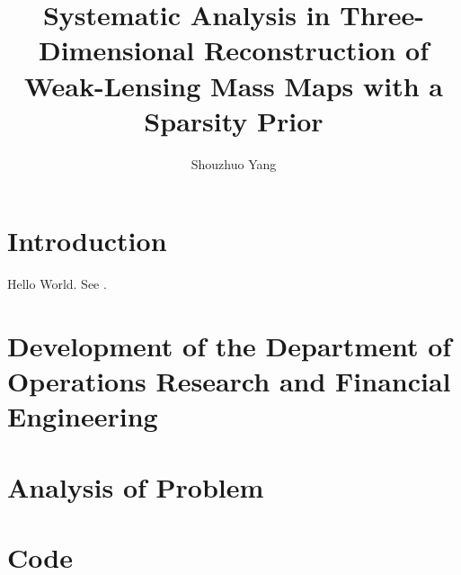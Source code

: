 \documentclass[12pt,lot,lof]{puthesis_undergraduate}
\title{Systematic Analysis in Three-Dimensional Reconstruction of Weak-Lensing Mass Maps
with a Sparsity Prior}
\author{Shouzhuo Yang}
\begin{document}
\chapter{Introduction}\label{ch:intro}  %

Hello World. See \cite{A01}.


\chapter{Development of the Department of Operations Research and Financial Engineering}  %


\chapter{Analysis of Problem}


\appendix
\chapter{Code}




 \label{bib}
\end{document}
